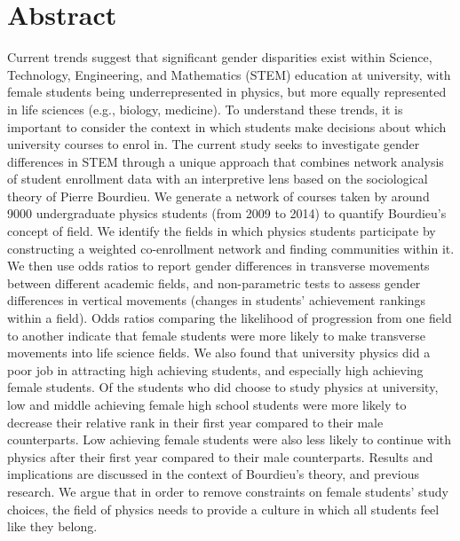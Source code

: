 \section{Abstract}
Current trends suggest that significant gender disparities exist within Science, Technology, Engineering, and Mathematics (STEM) education at university, with female students being underrepresented in physics, but more equally represented in life sciences (e.g., biology, medicine). To understand these trends, it is important to consider the context in which students make decisions about which university courses to enrol in. The current study seeks to investigate gender differences in STEM through a unique approach that combines network analysis of student enrollment data with an interpretive lens based on the sociological theory of Pierre Bourdieu. We generate a network of courses taken by around 9000 undergraduate physics students (from 2009 to 2014) to quantify Bourdieu's concept of field. We identify the fields in which physics students participate by constructing a weighted co-enrollment network and finding communities within it. We then use odds ratios to report gender differences in transverse movements between different academic fields, and non-parametric tests to assess gender differences in vertical movements (changes in students' achievement rankings within a field). Odds ratios comparing the likelihood of progression from one field to another indicate that female students were more likely to make transverse movements into life science fields. We also found that university physics did a poor job in attracting high achieving students, and especially high achieving female students. Of the students who did choose to study physics at university, low and middle achieving female high school students were more likely to decrease their relative rank in their first year compared to their male counterparts. Low achieving female students were also less likely to continue with physics after their first year compared to their male counterparts. Results and implications are discussed in the context of Bourdieu's theory, and previous research. We argue that in order to remove constraints on female students' study choices, the field of physics needs to provide a culture in which all students feel like they belong.



